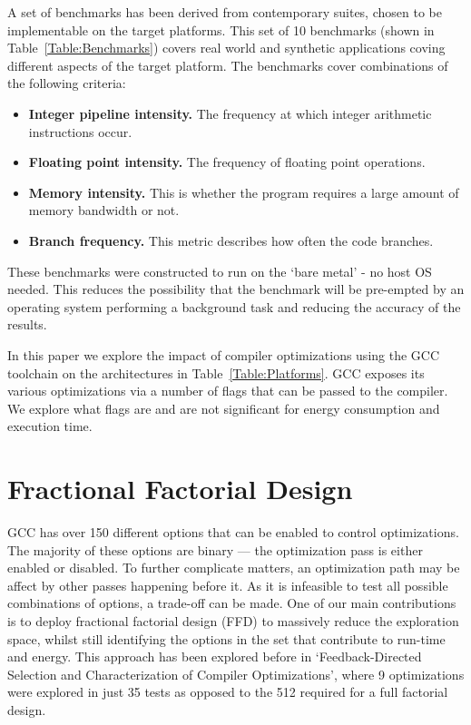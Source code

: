 \documentclass[twocolumn]{article}
\newcommand{\nsection}[1]{\section{\bfseries #1}}
\begin{document}
A set of benchmarks has been derived from contemporary suites, chosen to be implementable on the target platforms. This set of 10 benchmarks (shown in Table~\ref{Table:Benchmarks}) covers real world and synthetic applications coving different aspects of the target platform. The benchmarks cover combinations of the following criteria:
\begin{itemize}
	\setlength{\itemsep}{0em}
	\vspace{-1mm}
	\item \textbf{Integer pipeline intensity.} The frequency at which integer arithmetic instructions occur.
	\item \textbf{Floating point intensity.} The frequency of floating point operations.
	\item \textbf{Memory intensity.} This is whether the program requires a large amount of memory bandwidth or not.
	\item \textbf{Branch frequency.} This metric describes how often the code branches.
\end{itemize}

These benchmarks were constructed to run on the `bare metal' - no host OS needed. This reduces the possibility that the benchmark will be pre-empted by an operating system performing a background task and reducing the accuracy of the results.


In this paper we explore the impact of compiler optimizations using the GCC toolchain on the architectures in Table~\ref{Table:Platforms}. GCC exposes its various optimizations via a number of flags that can be passed to the compiler. We explore what flags are and are not significant for energy consumption and execution time.

\nsection{Fractional Factorial Design}

GCC has over 150 different options that can be enabled to control optimizations. The majority of these options are binary --- the optimization pass is either enabled or disabled. To further complicate matters, an optimization path may be affect by other passes happening before it. As it is infeasible to test all possible combinations of options, a trade-off can be made. One of our main contributions is to deploy fractional factorial design (FFD) to massively reduce the exploration space, whilst still identifying the options in the set that contribute to run-time and energy. This approach has been explored before in `Feedback-Directed Selection and Characterization of Compiler Optimizations'\cite{IntelPaper}, where 9 optimizations were explored in just 35 tests as opposed to the 512 required for a full factorial design.
\end{document}
